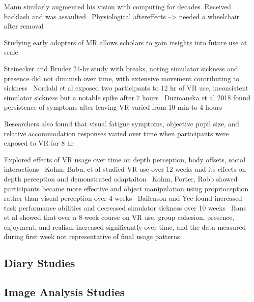 Mann similarly augmented his vision with computing for decades. 
Received backlash and was assaulted~\cite{} %
Physiological aftereffects --> needed a wheelchair after removal

Studying early adopters of MR allows scholars to gain insights into future use at scale~\cite{} %

Steinecker and Bruder 24-hr study with breaks, noting simulator sickness and presence did not
diminish over time, with extensive movement contributing to sickness~\cite{steinicke2014selfexperimentation}
Nordahl et al exposed two participants to 12 hr of VR use, inconsistent simulator sickness but a notable spike after 7 hours~\cite{nordahl2019hours}
Duzmanska et al 2018 found persistence of symptoms after leaving VR varied from 10 min to 4 hours~\cite{duzmanska2018simulatorsickness} 

Researchers also found
that visual fatigue symptoms, objective pupil size, and relative
accommodation responses varied over time when participants were
exposed to VR for 8 hr~\cite{guo2020exploring}

Explored effects of VR usage over time on depth perception, body offsets, social interactions~\cite{bailenson2024seeing}
Kohm, Babu, et al studied VR use over 12 weeks and its effects on depth perception and demonstrated adaptaiton~\cite{kohm2022objects} %
Kohm, Porter, Robb showed participants became more effective and object manipulation using proprioception rather than visual perception over 4 weeks~\cite{kohm2022handoffset}
Bailenson and Yee found increased task performance abilities and decreased simulator sickness over 10 weeks~\cite{bailenson2006longitudinal}
Hans et al showed that over a 8-week course on VR use, group cohesion, presence, enjoyment, and realism increased significantly over time, and the data measured during first week not representative of final usage patterns~\cite{han2023longitudinal} 


\subsection{Diary Studies}
% 

\subsection{Image Analysis Studies}

